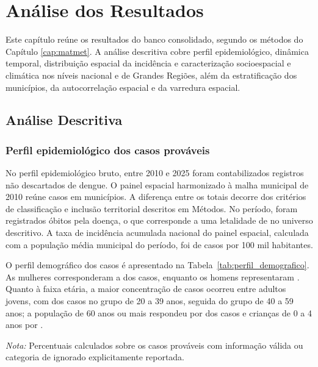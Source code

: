 \chapter{Análise dos Resultados}
\label{cap:resultados}

Este capítulo reúne os resultados do banco consolidado, segundo os métodos do Capítulo \ref{cap:matmet}. A análise descritiva cobre perfil epidemiológico, dinâmica temporal, distribuição espacial da incidência e caracterização socioespacial e climática nos níveis nacional e de Grandes Regiões, além da estratificação dos municípios, da autocorrelação espacial e da varredura espacial.

\section{Análise Descritiva}
\label{sec:descritiva}

\subsection{Perfil epidemiológico dos casos prováveis}

No perfil epidemiológico bruto, entre 2010 e 2025 foram contabilizados \TotalCasosProvaveis{} registros não descartados de dengue. O painel espacial harmonizado à malha municipal de 2010 reúne \ScanTotalCasos{} casos em \NumMunicipios{} municípios. A diferença entre os totais decorre dos critérios de classificação e inclusão territorial descritos em Métodos. No período, foram registrados \TotalObitos{} óbitos pela doença, o que corresponde a uma letalidade de \Letalidade{} no universo descritivo. A taxa de incidência acumulada nacional do painel espacial, calculada com a população média municipal do período, foi de \TIAccumBrasil{} casos por 100 mil habitantes.

O perfil demográfico dos casos é apresentado na Tabela~\ref{tab:perfil_demografico}. As mulheres corresponderam a \PctSexoFeminino{} dos casos, enquanto os homens representaram \PctSexoMasculino{}. Quanto à faixa etária, a maior concentração de casos ocorreu entre adultos jovens, com \PctFaixaVinteATrintaNove{} dos casos no grupo de 20 a 39 anos, seguida do grupo de 40 a 59 anos; a população de 60 anos ou mais respondeu por \PctFaixaSessentaMais{} dos casos e crianças de 0 a 4 anos por \PctFaixaZeroAQuatro{}.

\begin{table}[H]
\centering
\caption{Perfil demográfico dos casos prováveis de dengue, Brasil, 2010--2025.}
\label{tab:perfil_demografico}

\par\vspace{0.4em}
\parbox{0.9\linewidth}{\footnotesize\textit{Nota:} Percentuais calculados sobre os casos prováveis com informação válida ou categoria de ignorado explicitamente reportada.}
\end{table}

